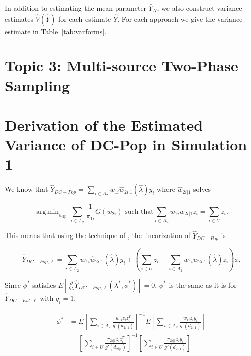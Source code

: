 \documentclass[12pt]{article}
\DeclareMathOperator*{\argmin}{arg\,min}
\begin{document}
In addition to estimating the mean parameter $\bar Y_N$, we also construct
variance estimates $\hat V(\hat Y)$ for each estimate $\hat Y$. For each
approach we give the variance estimate in Table~\ref{tab:varforms}.


\section{Topic 3: Multi-source Two-Phase Sampling}

\newpage 




\newpage

\appendix

\section{Derivation of the Estimated Variance of DC-Pop in Simulation 1}

We know that $\hat Y_{DC-Pop} = \sum_{i \in A_2} w_{1i} \hat w_{2i|1}(\hat
\lambda) y_i$ where $\hat w_{2i|1}$ solves

  \begin{equation}
    \argmin_{w_{2|1}} \sum_{i \in A_2} \frac{1}{\pi_{1i}} G(w_{2i})
    \text{ such that}
    \sum_{i \in A_2} w_{1i} w_{2i|1} z_i = \sum_{i \in U} z_i.
  \end{equation}

This means that using the technique of \cite{randles1982asymptotic},
the linearization of $\hat Y_{DC-Pop}$ is 

$$\hat Y_{DC-Pop, \ell} = \sum_{i \in A_2} w_{1i} \hat w_{2i|1}(\hat \lambda) y_i + 
\left( \sum_{i \in U} z_i - 
\sum_{i \in A_2} w_{1i} w_{2i|1}(\hat \lambda) z_i \right) \phi.$$

Since $\phi^*$ satisfies $E\left[\frac{\partial}{\partial \lambda} \hat Y_{DC-Pop,
\ell}(\lambda^*, \phi^*)\right] = 0$, $\phi^*$ is the same as it is for $\hat Y_{DC-Est,
\ell}$ with $q_i = 1$,

  \begin{align*}
    \phi^*
    &= E\left[\sum_{i \in A_2} \frac{w_{1i}z_i z_i^T }{g'(d_{2i|1})}\right]^{-1}
    E\left[\sum_{i \in A_2} \frac{w_{1i}z_i y_i}{g'(d_{2i|1})}\right]\\
    &= \left[\sum_{i \in U} \frac{\pi_{2i|1}z_i z_i^T}{g'(d_{2i|1})}\right]^{-1}
    \left[\sum_{i \in U} \frac{\pi_{2i|1} z_i y_i}{g'(d_{2i|1})}\right].\\
  \end{align*}
\end{document}
